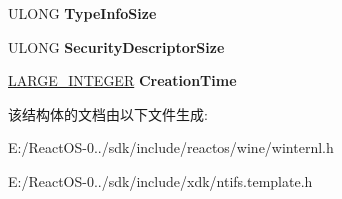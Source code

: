 \begin{DoxyCompactItemize}
U\+L\+O\+NG {\bfseries Type\+Info\+Size}
\item 
\mbox{\label{struct___o_b_j_e_c_t___b_a_s_i_c___i_n_f_o_r_m_a_t_i_o_n_aee7ab270ffac839e3ef0ddb893c3bb20}} 
U\+L\+O\+NG {\bfseries Security\+Descriptor\+Size}
\item 
\mbox{\label{struct___o_b_j_e_c_t___b_a_s_i_c___i_n_f_o_r_m_a_t_i_o_n_a094b69253b0df86c42c29714376dc384}} 
\hyperlink{union___l_a_r_g_e___i_n_t_e_g_e_r}{L\+A\+R\+G\+E\+\_\+\+I\+N\+T\+E\+G\+ER} {\bfseries Creation\+Time}
\end{DoxyCompactItemize}


该结构体的文档由以下文件生成\+:\begin{DoxyCompactItemize}
\item 
E\+:/\+React\+O\+S-\/0../sdk/include/reactos/wine/winternl.\+h\item 
E\+:/\+React\+O\+S-\/0../sdk/include/xdk/ntifs.\+template.\+h\end{DoxyCompactItemize}
